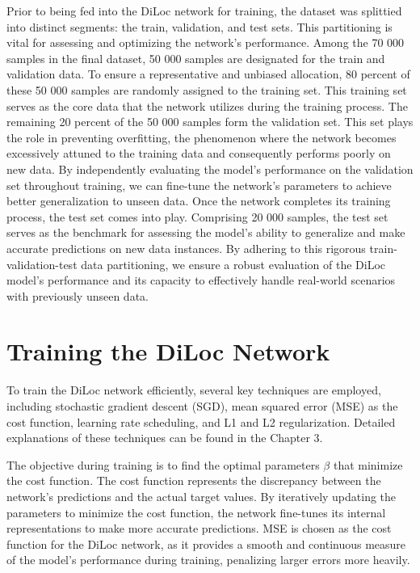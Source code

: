 \documentclass[a4paper, UKenglish, 11pt]{uiomaster}
\begin{document}
Prior to being fed into the DiLoc network for training, the dataset was splittied into distinct segments: the train, validation, and test sets. This partitioning is vital for assessing and optimizing the network's performance. Among the 70 000 samples in the final dataset, 50 000 samples are designated for the train and validation data. To ensure a representative and unbiased allocation, 80 percent of these 50 000 samples are randomly assigned to the training set. This training set serves as the core data that the network utilizes during the training process. The remaining 20 percent of the 50 000 samples form the validation set. This set plays the role in preventing overfitting, the phenomenon where the network becomes excessively attuned to the training data and consequently performs poorly on new data. By independently evaluating the model's performance on the validation set throughout training, we can fine-tune the network's parameters to achieve better generalization to unseen data. Once the network completes its training process, the test set comes into play. Comprising 20 000 samples, the test set serves as the benchmark for assessing the model's ability to generalize and make accurate predictions on new data instances. By adhering to this rigorous train-validation-test data partitioning, we ensure a robust evaluation of the DiLoc model's performance and its capacity to effectively handle real-world scenarios with previously unseen data.


\section{Training the DiLoc Network}
To train the DiLoc network efficiently, several key techniques are employed, including stochastic gradient descent (SGD), mean squared error (MSE) as the cost function, learning rate scheduling, and L1 and L2 regularization. Detailed explanations of these techniques can be found in the Chapter 3.

The objective during training is to find the optimal parameters $\beta$ that minimize the cost function. The cost function represents the discrepancy between the network's predictions and the actual target values. By iteratively updating the parameters to minimize the cost function, the network fine-tunes its internal representations to make more accurate predictions. MSE is chosen as the cost function for the DiLoc network, as it provides a smooth and continuous measure of the model's performance during training, penalizing larger errors more heavily.
\end{document}

